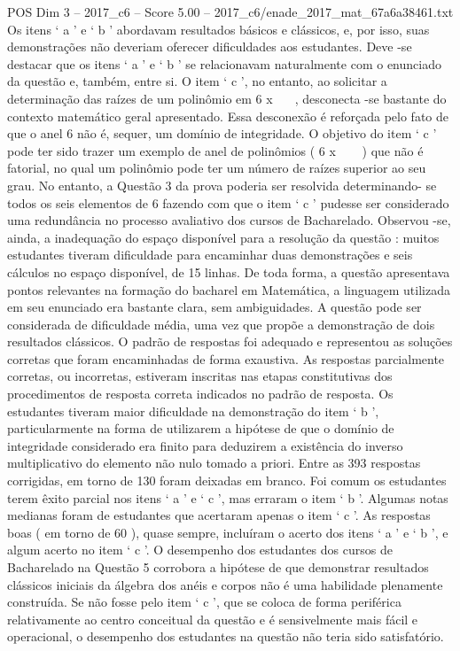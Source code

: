 \begin{textsample}{POS Dim 3 – 2017\_c6 – Score 5.00 – 2017\_c6/enade\_2017\_mat\_67a6a38461.txt}
Os itens ‘ a ’ e ‘ b ’ abordavam resultados básicos e clássicos, e, por isso, suas demonstrações não deveriam oferecer dificuldades aos estudantes.
Deve -se destacar que os itens ‘ a ’ e ‘ b ’ se relacionavam naturalmente com o enunciado da questão e, também, entre si.
O item ‘ c ’, no entanto, ao solicitar a determinação das raízes de um polinômio em 6 x  , desconecta -se bastante do contexto matemático geral apresentado.
Essa desconexão é reforçada pelo fato de que o anel 6 não é, sequer, um domínio de integridade.
O objetivo do item ‘ c ’ pode ter sido trazer um exemplo de anel de polinômios ( 6 x   ) que não é fatorial, no qual um polinômio pode ter um número de raízes superior ao seu grau.
No entanto, a Questão 3 da prova poderia ser resolvida determinando- se todos os seis elementos de 6 fazendo com que o item ‘ c ’ pudesse ser considerado uma redundância no processo avaliativo dos cursos de Bacharelado.
Observou -se, ainda, a inadequação do espaço disponível para a resolução da questão : muitos estudantes tiveram dificuldade para encaminhar duas demonstrações e seis cálculos no espaço disponível, de 15 linhas.
De toda forma, a questão apresentava pontos relevantes na formação do bacharel em Matemática, a linguagem utilizada em seu enunciado era bastante clara, sem ambiguidades.
A questão pode ser considerada de dificuldade média, uma vez que propõe a demonstração de dois resultados clássicos.
O padrão de respostas foi adequado e representou as soluções corretas que foram encaminhadas de forma exaustiva.
As respostas parcialmente corretas, ou incorretas, estiveram inscritas nas etapas constitutivas dos procedimentos de resposta correta indicados no padrão de resposta.
Os estudantes tiveram maior dificuldade na demonstração do item ‘ b ’, particularmente na forma de utilizarem a hipótese de que o domínio de integridade considerado era finito para deduzirem a existência do inverso multiplicativo do elemento não nulo tomado a priori.
Entre as 393 respostas corrigidas, em torno de 130 foram deixadas em branco.
Foi comum os estudantes terem êxito parcial nos itens ‘ a ’ e ‘ c ’, mas erraram o item ‘ b ’.
Algumas notas medianas foram de estudantes que acertaram apenas o item ‘ c ’.
As respostas boas ( em torno de 60 ), quase sempre, incluíram o acerto dos itens ‘ a ’ e ‘ b ’, e algum acerto no item ‘ c ’.
O desempenho dos estudantes dos cursos de Bacharelado na Questão 5 corrobora a hipótese de que demonstrar resultados clássicos iniciais da álgebra dos anéis e corpos não é uma habilidade plenamente construída.
Se não fosse pelo item ‘ c ’, que se coloca de forma periférica relativamente ao centro conceitual da questão e é sensivelmente mais fácil e operacional, o desempenho dos estudantes na questão não teria sido satisfatório.

\end{textsample}
